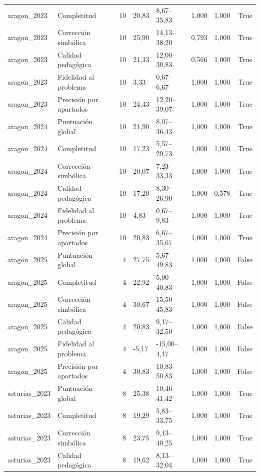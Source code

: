 \begin{tabular}{llrllllr}
aragon\_2023 & Completitud & 10 & 20,83 & 8,67–35,83 & 1,000 & 1,000 & True \\
aragon\_2023 & Corrección simbólica & 10 & 25,90 & 14,13–38,20 & 0,793 & 1,000 & True \\
aragon\_2023 & Calidad pedagógica & 10 & 21,33 & 12,00–30,83 & 0,566 & 1,000 & True \\
aragon\_2023 & Fidelidad al problema & 10 & 3,33 & 0,67–6,67 & 1,000 & 1,000 & True \\
aragon\_2023 & Precisión por apartados & 10 & 24,43 & 12,20–39,07 & 1,000 & 1,000 & True \\
aragon\_2024 & Puntuación global & 10 & 21,90 & 8,07–36,43 & 1,000 & 1,000 & True \\
aragon\_2024 & Completitud & 10 & 17,23 & 5,57–29,73 & 1,000 & 1,000 & True \\
aragon\_2024 & Corrección simbólica & 10 & 20,07 & 7,23–33,33 & 1,000 & 1,000 & True \\
aragon\_2024 & Calidad pedagógica & 10 & 17,20 & 8,30–26,90 & 1,000 & 0,578 & True \\
aragon\_2024 & Fidelidad al problema & 10 & 4,83 & 0,67–9,83 & 1,000 & 1,000 & True \\
aragon\_2024 & Precisión por apartados & 10 & 20,83 & 6,67–35,67 & 1,000 & 1,000 & True \\
aragon\_2025 & Puntuación global & 4 & 27,75 & 5,67–49,83 & 1,000 & 1,000 & False \\
aragon\_2025 & Completitud & 4 & 22,92 & 5,00–40,83 & 1,000 & 1,000 & False \\
aragon\_2025 & Corrección simbólica & 4 & 30,67 & 15,50–45,83 & 1,000 & 1,000 & False \\
aragon\_2025 & Calidad pedagógica & 4 & 20,83 & 9,17–32,50 & 1,000 & 1,000 & False \\
aragon\_2025 & Fidelidad al problema & 4 & -5,17 & -15,00–4,17 & 1,000 & 1,000 & False \\
aragon\_2025 & Precisión por apartados & 4 & 30,83 & 10,83–50,83 & 1,000 & 1,000 & False \\
asturias\_2023 & Puntuación global & 8 & 25,38 & 10,46–41,42 & 1,000 & 1,000 & True \\
asturias\_2023 & Completitud & 8 & 19,29 & 5,83–33,75 & 1,000 & 1,000 & True \\
asturias\_2023 & Corrección simbólica & 8 & 23,75 & 9,13–40,25 & 1,000 & 1,000 & True \\
asturias\_2023 & Calidad pedagógica & 8 & 19,62 & 8,13–32,04 & 1,000 & 1,000 & True \\

\end{tabular}
